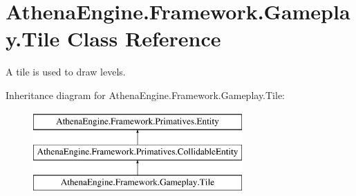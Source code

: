 \hypertarget{class_athena_engine_1_1_framework_1_1_gameplay_1_1_tile}{\section{Athena\-Engine.\-Framework.\-Gameplay.\-Tile Class Reference}
\label{class_athena_engine_1_1_framework_1_1_gameplay_1_1_tile}
}


A tile is used to draw levels.  


Inheritance diagram for Athena\-Engine.\-Framework.\-Gameplay.\-Tile\-:\begin{figure}[H]
\begin{center}
\leavevmode
\includegraphics[height=3.000000cm]{class_athena_engine_1_1_framework_1_1_gameplay_1_1_tile}
\end{center}
\end{figure}
